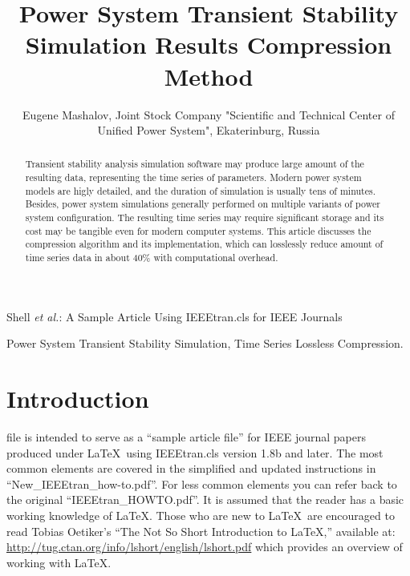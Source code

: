 \documentclass[lettersize,journal]{IEEEtran}
\begin{document}
\title{Power System Transient Stability Simulation Results Compression Method}

\author {Eugene Mashalov, Joint Stock Company "Scientific and Technical Center of Unified Power System", Ekaterinburg, Russia}


%
{Shell \MakeLowercase{\textit{et al.}}: A Sample Article Using IEEEtran.cls for IEEE Journals}


\maketitle

\begin{abstract}
Transient stability analysis simulation software may produce large amount of
the resulting data, representing the time series of parameters. Modern power system models
are higly detailed, and the duration of simulation is usually tens of minutes. 
Besides, power system simulations generally performed on multiple variants of
power system configuration. The resulting time series may require significant storage 
and its cost may be tangible even for modern computer systems.
This article discusses the compression algorithm and its implementation, which can 
losslessly reduce amount of time series data in about 40\% with computational overhead.
\end{abstract}

\begin{IEEEkeywords}
Power System Transient Stability Simulation, Time Series Lossless Compression.
\end{IEEEkeywords}

\section{Introduction}
 file is intended to serve as a ``sample article file''
for IEEE journal papers produced under \LaTeX\ using
IEEEtran.cls version 1.8b and later. The most common elements are covered in the simplified and updated instructions in ``New\_IEEEtran\_how-to.pdf''. For less common elements you can refer back to the original ``IEEEtran\_HOWTO.pdf''. It is assumed that the reader has a basic working knowledge of \LaTeX. Those who are new to \LaTeX \ are encouraged to read Tobias Oetiker's ``The Not So Short Introduction to \LaTeX ,'' available at: \url{http://tug.ctan.org/info/lshort/english/lshort.pdf} which provides an overview of working with \LaTeX.
\end{document}
